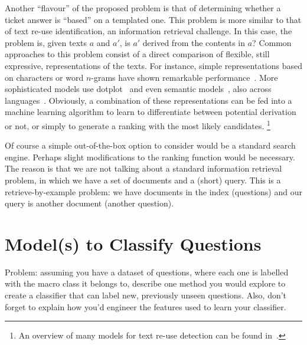 \documentclass{sig-alternate-05-2015}
\begin{document}
Another ``flavour'' of the proposed problem is that of determining whether a 
ticket answer is ``based'' on a templated one. This problem is more similar to 
that of text re-use identification, an information retrieval challenge.  
In this case, the problem is, given texts $a$ and $a'$, is $a'$ derived from the 
contents in $a$? Common approaches to this problem consist of a direct 
comparison of flexible, still expressive, representations of the texts. For 
instance, simple representations based on characters or word $n$-grams have 
shown remarkable performance~\cite{Lyon:04}. More sophisticated models use 
dotplot~\cite{Basile:2009} and even semantic models~\cite{Gabrilovich:07}, also 
across languages~\cite{Potthast:11}. Obviously, a combination of these 
representations can be fed into a machine learning algorithm to learn to 
differentiate between potential derivation or not, or simply to generate a 
ranking with the most likely candidates.%
\footnote{An overview of many models for text re-use detection can be found 
in~\cite{BarronPhd:12}.}

Of course a simple out-of-the-box option to consider would be a standard search 
engine. Perhaps slight modifications to the ranking function would be 
necessary. The reason is that we are not talking about a standard 
information retrieval problem, in which we have a set of documents and a (short) 
query. This is a retrieve-by-example problem: we have documents in the index 
(questions) and our query is another document (another question). 


\section{Model(s) to Classify Questions}

Problem: assuming you have a dataset of questions, where each one is labelled 
with the macro class it belongs to, describe one method you would explore to 
create a classifier that can label new, previously unseen questions. Also, don't 
forget to explain how you'd engineer the features used to learn your classifier.
\medskip
\end{document}
